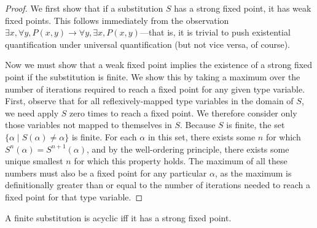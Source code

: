 \documentclass[10pt, letterpaper, oneside]{article}
\begin{document}
\begin{proof}
  We first show that if a substitution \(S\) has a strong fixed point, it has weak fixed points. This follows immediately from the observation \(\exists x, \forall y, P(x,y) \to \forall y, \exists x, P(x,y)\)---that is, it is trivial to push existential quantification under universal quantification (but not vice versa, of course).

  Now we must show that a weak fixed point implies the existence of a strong fixed point if the substitution is finite. We show this by taking a maximum over the number of iterations required to reach a fixed point for any given type variable. First, observe that for all reflexively-mapped type variables in the domain of \(S\), we need apply \(S\) zero times to reach a fixed point. We therefore consider only those variables not mapped to themselves in \(S\). Because \(S\) is finite, the set \(\{\alpha \mid S(\alpha) \ne \alpha\}\) is finite. For each \(\alpha\) in this set, there exists some \(n\) for which \(S^n(\alpha) = S^{n + 1}(\alpha)\), and by the well-ordering principle, there exists some unique smallest \(n\) for which this property holds. The maximum of all these numbers must also be a fixed point for any particular \(\alpha\), as the maximum is definitionally greater than or equal to the number of iterations needed to reach a fixed point for that type variable.
\end{proof}

\begin{lemma}
  \label{lemma:finite-acyclic-strong}
  A finite substitution is acyclic iff it has a strong fixed point.
\end{lemma}
\end{document}
